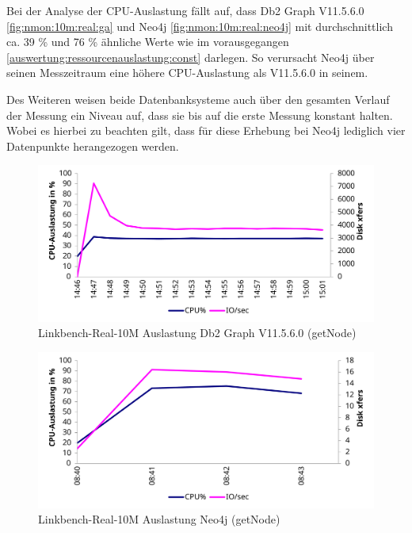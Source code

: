 Bei der Analyse der CPU-Auslastung fällt auf, dass Db2 Graph V11.5.6.0 \autoref{fig:nmon:10m:real:ga} und Neo4j \autoref{fig:nmon:10m:real:neo4j} mit durchschnittlich ca. 39 \% und 76 \% ähnliche Werte wie im vorausgegangen \autoref{auswertung:ressourcenauslastung:const} darlegen. So verursacht Neo4j über seinen Messzeitraum eine höhere CPU-Auslastung als V11.5.6.0 in seinem.   

Des Weiteren weisen beide Datenbanksysteme auch über den gesamten Verlauf der Messung ein Niveau auf, dass sie bis auf die erste Messung konstant halten. Wobei es hierbei zu beachten gilt, dass für diese Erhebung bei Neo4j lediglich vier Datenpunkte herangezogen werden.

\begin{figure}[!ht]
    \centering
    \includegraphics[width=\textwidth]{images/stats/linkbench-10m-real_ga.pdf}
    \caption{Linkbench-Real-10M Auslastung Db2 Graph V11.5.6.0 (getNode)}
    \label{fig:nmon:10m:real:ga}
\end{figure}

\begin{figure}[!ht]
    \centering
    \includegraphics[width=\textwidth]{images/stats/linkbench-10m-real_neo4j.pdf}
    \caption{Linkbench-Real-10M Auslastung Neo4j (getNode)}
    \label{fig:nmon:10m:real:neo4j}
\end{figure}


